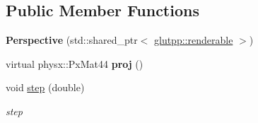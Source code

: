 \subsection*{\-Public \-Member \-Functions}
\begin{DoxyCompactItemize}
\item 
\hypertarget{classglutpp_1_1Camera_1_1Projection_1_1Perspective_ab11e22787e90b3ebd444e32991fb5a7a}{{\bfseries \-Perspective} (std\-::shared\-\_\-ptr$<$ \hyperlink{classglutpp_1_1renderable}{glutpp\-::renderable} $>$)}\label{classglutpp_1_1Camera_1_1Projection_1_1Perspective_ab11e22787e90b3ebd444e32991fb5a7a}

\item 
\hypertarget{classglutpp_1_1Camera_1_1Projection_1_1Perspective_a2fec5469b70c19093e4d2932a9ceec0a}{virtual physx\-::\-Px\-Mat44 {\bfseries proj} ()}\label{classglutpp_1_1Camera_1_1Projection_1_1Perspective_a2fec5469b70c19093e4d2932a9ceec0a}

\item 
\hypertarget{classglutpp_1_1Camera_1_1Projection_1_1Perspective_a74771031b253ee639dff1a15e6b9c32d}{void \hyperlink{classglutpp_1_1Camera_1_1Projection_1_1Perspective_a74771031b253ee639dff1a15e6b9c32d}{step} (double)}\label{classglutpp_1_1Camera_1_1Projection_1_1Perspective_a74771031b253ee639dff1a15e6b9c32d}

\begin{DoxyCompactList}\small\item\em step \end{DoxyCompactList}\end{DoxyCompactItemize}
